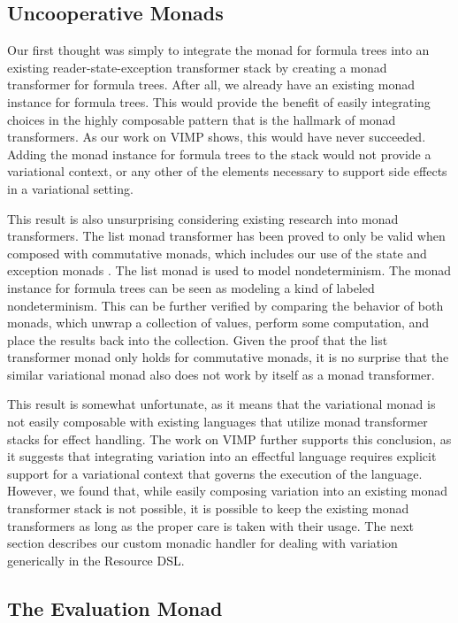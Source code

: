 \documentclass[12pt,oneside]{book}
\begin{document}
\subsection{Uncooperative Monads}

Our first thought was simply to integrate the monad for formula trees into an existing reader-state-exception transformer stack by
creating a monad transformer for formula trees.
After all, we already have an existing monad instance for formula trees. This would provide the benefit of easily integrating choices in the highly
composable pattern that is the hallmark of monad transformers. As our work on VIMP shows, this would have never succeeded.
Adding the monad instance for formula trees to the stack would not provide a variational context, or any other of the elements
necessary to support side effects in a variational setting.

This result is also unsurprising considering existing research into monad transformers. The list monad transformer has been
proved to only be valid when composed with commutative monads, which includes our use of the state and exception monads \cite{jones1993composing}.
The list monad is used to model nondeterminism. The monad instance for formula trees can be seen as modeling a kind of labeled nondeterminism.
This can be further verified by comparing the behavior of both monads, which unwrap a collection of values, perform some computation, and
place the results back into the collection. Given the proof that the list transformer monad only holds for commutative monads, it is no
surprise that the similar variational monad also does not work by itself as a monad transformer.

This result is somewhat unfortunate, as it means that the variational monad is not easily composable with existing languages
that utilize monad transformer stacks for effect handling. The work on VIMP further supports this conclusion, as it suggests that
integrating variation into an effectful language requires explicit support for a variational context that governs the execution of the
language. However, we found that, while easily composing variation into an existing monad transformer stack is not possible, it
is possible to keep the existing monad transformers as long as the proper care is taken with their usage. The next section
describes our custom monadic handler for dealing with variation generically in the Resource DSL.

\subsection{The Evaluation Monad}
\label{sec:evalmonad}
\end{document}
